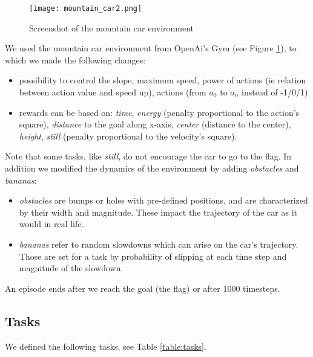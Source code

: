 \documentclass{article}
\newenvironment{myitemize}
{ \begin{itemize}
		\setlength{\itemsep}{0pt}
		\setlength{\parskip}{0pt}
		\setlength{\parsep}{0pt}     }
	{ \end{itemize}                  }
\begin{document}
\begin{figure}
\centering
\texttt{[image: mountain\_car2.png]}
\caption{Screenshot of the mountain car environment}
\label{fig:env}
\end{figure}

We used the mountain car environment from OpenAi's Gym (see Figure \ref{fig:env}), to which we made the following changes:

\begin{myitemize}
\item possibility to control the slope, maximum speed, power of actions (ie relation between action value and speed up), actions (from $a_0$ to $a_n$ instead of -1/0/1)

\item rewards can be based on: \textit{time}, \textit{energy} (penalty proportional to the action's square), \textit{distance} to the goal along x-axis, \textit{center} (distance to the center), \textit{height}, \textit{still} (penalty proportional to the velocity's square).

\end{myitemize}

\noindent Note that some tasks, like \textit{still}, do not encourage the car to go to the flag. In addition we modified the dynamics of the environment by adding \textit{obstacles} and \textit{bananas}:
\begin{myitemize}
\item \textit{obstacles} are bumps or holes with pre-defined positions, and are characterized by their width and magnitude. These impact the trajectory of the car as it would in real life.
\item \textit{bananas} refer to random slowdowns which can arise on the car's trajectory. Those are set for a task by probability of slipping at each time step and magnitude of the slowdown.
\end{myitemize}

\noindent An episode ends after we reach the goal (the flag) or after 1000 timesteps.

\subsection{Tasks}
We defined the following tasks, see Table \ref{table:tasks}.
\end{document}
